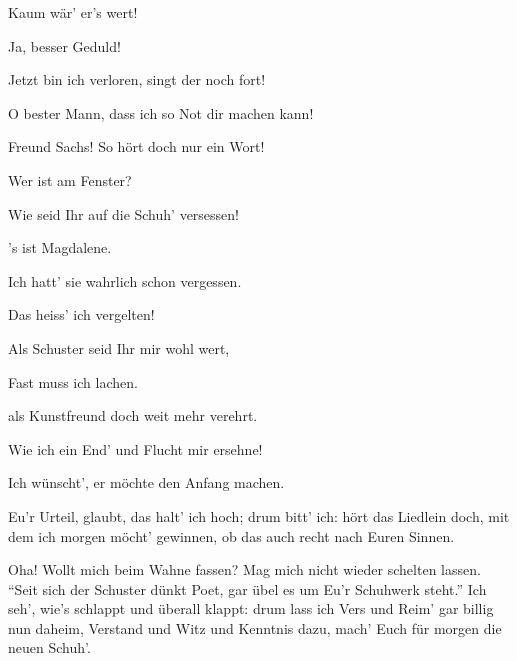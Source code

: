\begin{drama}
Kaum wär' er's wert!

\Evaspeaks
Ja, besser Geduld!

\Beckmesserspeaks


Jetzt bin ich verloren, singt der noch fort!

\Evaspeaks
O bester Mann,
dass ich so Not dir machen kann!

\Beckmesserspeaks


Freund Sachs! So hört doch nur ein Wort!

\Waltherspeaks


Wer ist am Fenster?

\Beckmesserspeaks
Wie seid Ihr auf die Schuh' versessen!

\Evaspeaks
's ist Magdalene.

\Beckmesserspeaks
Ich hatt' sie wahrlich schon vergessen.

\Waltherspeaks
Das heiss' ich vergelten!

\Beckmesserspeaks
Als Schuster seid Ihr mir wohl wert,

\Waltherspeaks
Fast muss ich lachen.

\Beckmesserspeaks
als Kunstfreund doch weit mehr verehrt.

\Evaspeaks
Wie ich ein End' und Flucht mir ersehne!

\Waltherspeaks
Ich wünscht', er möchte den Anfang machen.



\Beckmesserspeaks
Eu'r Urteil, glaubt, das halt' ich hoch;
drum bitt' ich:
hört das Liedlein doch,
mit dem ich morgen möcht' gewinnen,
ob das auch recht nach Euren Sinnen.



\Sachsspeaks
Oha! Wollt mich beim Wahne fassen?
Mag mich nicht wieder schelten lassen.
``Seit sich der Schuster dünkt Poet,
gar übel es um Eu'r Schuhwerk steht.''
Ich seh', wie's schlappt und überall klappt:
drum lass ich Vers und Reim'
gar billig nun daheim,
Verstand und Witz und Kenntnis dazu,
mach' Euch für morgen die neuen Schuh'.


\end{drama}
